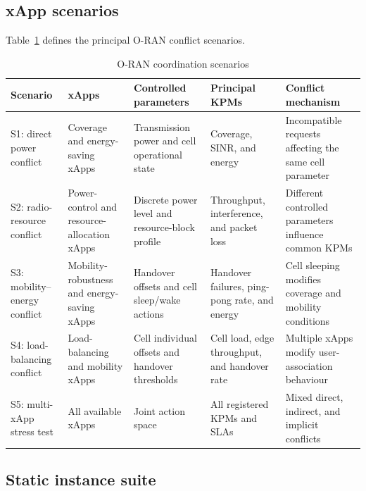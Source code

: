\documentclass[pdflatex,sn-mathphys-num,iicol,oneside]{sn-jnl}
\begin{document}
\subsection{xApp scenarios}

Table~\ref{tab:scenarios} defines the principal O-RAN conflict
scenarios.

\begin{table}[t]
\centering
\caption{O-RAN coordination scenarios}
\label{tab:scenarios}
\begin{tabular}{
p{19mm}
p{28mm}
p{34mm}
p{34mm}
p{39mm}
}
\toprule
Scenario &
xApps &
Controlled parameters &
Principal KPMs &
Conflict mechanism\\
\midrule

S1: direct power conflict &
Coverage and energy-saving xApps &
Transmission power and cell operational state &
Coverage, SINR, and energy &
Incompatible requests affecting the same cell parameter\\

S2: radio-resource conflict &
Power-control and resource-allocation xApps &
Discrete power level and resource-block profile &
Throughput, interference, and packet loss &
Different controlled parameters influence common KPMs\\

S3: mobility--energy conflict &
Mobility-robustness and energy-saving xApps &
Handover offsets and cell sleep/wake actions &
Handover failures, ping-pong rate, and energy &
Cell sleeping modifies coverage and mobility conditions\\

S4: load-balancing conflict &
Load-balancing and mobility xApps &
Cell individual offsets and handover thresholds &
Cell load, edge throughput, and handover rate &
Multiple xApps modify user-association behaviour\\

S5: multi-xApp stress test &
All available xApps &
Joint action space &
All registered KPMs and SLAs &
Mixed direct, indirect, and implicit conflicts\\

\bottomrule
\end{tabular}
\end{table}

\subsection{Static instance suite}
\end{document}
